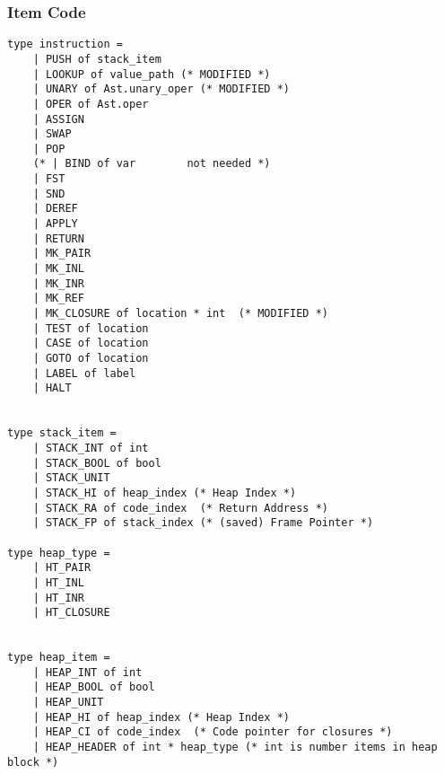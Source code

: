 \documentclass{article}
\begin{document}
\subsubsection{Item Code}
\begin{lstlisting}
type instruction =
	| PUSH of stack_item
	| LOOKUP of value_path (* MODIFIED *)
	| UNARY of Ast.unary_oper (* MODIFIED *)
	| OPER of Ast.oper
	| ASSIGN
	| SWAP
	| POP
	(* | BIND of var 		not needed *)
	| FST
	| SND
	| DEREF
	| APPLY
	| RETURN
	| MK_PAIR
	| MK_INL
	| MK_INR
	| MK_REF
	| MK_CLOSURE of location * int  (* MODIFIED *)
	| TEST of location
	| CASE of location
	| GOTO of location
	| LABEL of label
	| HALT
	
	
type stack_item =
	| STACK_INT of int
	| STACK_BOOL of bool
	| STACK_UNIT
	| STACK_HI of heap_index (* Heap Index *)
	| STACK_RA of code_index  (* Return Address *)
	| STACK_FP of stack_index (* (saved) Frame Pointer *)
	 
type heap_type = 
	| HT_PAIR
	| HT_INL
	| HT_INR
	| HT_CLOSURE
	
	
type heap_item =
	| HEAP_INT of int
	| HEAP_BOOL of bool
	| HEAP_UNIT
	| HEAP_HI of heap_index (* Heap Index *)
	| HEAP_CI of code_index  (* Code pointer for closures *)
	| HEAP_HEADER of int * heap_type (* int is number items in heap block *)
\end{lstlisting}
\end{document}

